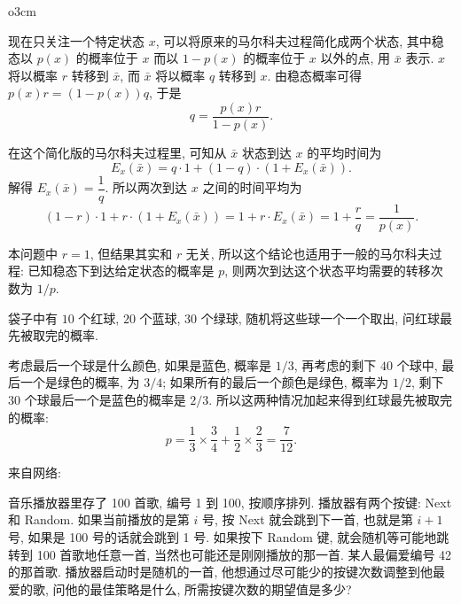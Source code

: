\begin{wrapfigure}{o}{3cm}
\vspace{-1em}
\end{wrapfigure}
\mbox{}
现在只关注一个特定状态 $ x $, 可以将原来的马尔科夫过程简化成两个状态, 其中稳态以 $ p(x) $ 的概率位于 $ x $ 而以 $ 1 - p(x) $ 的概率位于 $ x $ 以外的点, 用 $ \bar{x} $ 表示. $ x $ 将以概率 $ r $ 转移到 $ \bar{x} $, 而 $ \bar{x} $ 将以概率 $ q $ 转移到 $ x $. 由稳态概率可得 $ p(x) r = (1-p(x))q $, 于是 
\[ q = \frac{p(x)r}{1-p(x)}. \]

在这个简化版的马尔科夫过程里, 可知从 $ \bar{x} $ 状态到达 $ x $ 的平均时间为 
\[ E_x(\bar{x}) = q\cdot 1 + (1-q)\cdot (1+E_x(\bar{x})). \]
解得 $ E_x(\bar{x}) = \dfrac{1}{q}.$ 所以两次到达 $ x $ 之间的时间平均为 
\[ (1-r)\cdot 1 + r\cdot (1+E_x(\bar{x})) = 1 + r\cdot E_x(\bar{x}) = 1 + \frac{r}{q} = \dfrac{1}{p(x)} .\]

本问题中 $ r = 1 $, 但结果其实和 $ r $ 无关, 所以这个结论也适用于一般的马尔科夫过程: 已知稳态下到达给定状态的概率是 $ p $, 则两次到达这个状态平均需要的转移次数为 $ 1/p $.

\newpage

袋子中有 $ 10 $ 个红球, $ 20 $ 个蓝球, $ 30 $ 个绿球, 随机将这些球一个一个取出, 问红球最先被取完的概率.

考虑最后一个球是什么颜色, 如果是蓝色, 概率是 $ 1/3 $, 再考虑的剩下 $ 40 $ 个球中, 最后一个是绿色的概率, 为 $ 3/4 $; 如果所有的最后一个颜色是绿色, 概率为 $ 1/2 $, 剩下 $ 30 $ 个球最后一个是蓝色的概率是 $ 2/3 $. 所以这两种情况加起来得到红球最先被取完的概率: 
\[ p = \frac{1}{3} \times \frac{3}{4} + \frac{1}{2} \times \frac{2}{3} = \frac{7}{12} .\]

\newpage
\noindent 来自网络: 

音乐播放器里存了 100 首歌, 编号 1 到 100, 按顺序排列. 播放器有两个按键: Next 和 Random. 如果当前播放的是第 $i$ 号, 按 Next 就会跳到下一首, 也就是第 $i+1$ 号, 如果是 100 号的话就会跳到 1 号. 如果按下 Random 键, 就会随机等可能地跳转到 100 首歌地任意一首, 当然也可能还是刚刚播放的那一首. 某人最偏爱编号 42 的那首歌. 播放器启动时是随机的一首, 他想通过尽可能少的按键次数调整到他最爱的歌, 问他的最佳策略是什么, 所需按键次数的期望值是多少?

